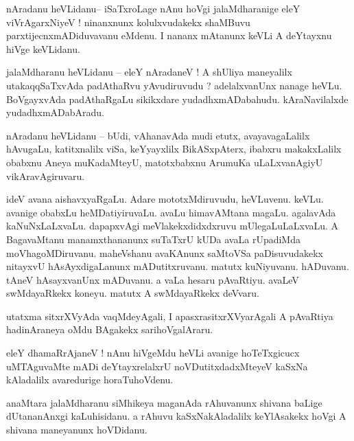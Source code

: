\documentclass{article}
\begin{document}
\begin{mn}%
nAradanu heVLidanu-- iSaTxroLage nAnu hoVgi jalaMdharanige eleY viVrAgarxNiyeV ! ninanxnunx 
kolulxvudakekx shaMBuvu parxtijecnxmADiduvavanu eMdenu. I nananx mAtanunx keVLi A deYtayxnu 
hiVge keVLidanu.
\end{mn}

\begin{mn}%
jalaMdharanu heVLidanu -- eleY nAradaneV ! A shUliya maneyalilx utakaqqSaTxvAda padAthaRvu 
yAvudiruvudu ? adelalxvanUnx nanage heVLu. BoVgayxvAda padAthaRgaLu sikikxdare 
yudadhxmADabahudu. kAraNavilalxde yudadhxmADabAradu.
\end{mn}

\begin{mn}%
nAradanu heVLidanu -- bUdi, vAhanavAda mudi etutx, avayavagaLalilx hAvugaLu, katitxnalilx viSa,
keYyayxlilx BikASxpAterx, ibabxru makakxLalilx obabxnu Aneya muKadaMteyU, matotxbabxnu 
ArumuKa uLaLxvanAgiyU vikAravAgiruvaru.
\end{mn}

\begin{mn}%
ideV avana aishavxyaRgaLu. Adare mototxMdiruvudu, heVLuvenu. keVLu. avanige obabxLu 
heMDatiyiruvaLu. avaLu himavAMtana magaLu. agalavAda kaNuNxLaLxvaLu. dapapxvAgi 
meVlakekxdidxdxruvu mUlegaLuLaLxvaLu. A BagavaMtanu manamxthananunx suTaTxrU kUDa avaLa 
rUpadiMda moVhagoMDiruvanu. maheVshanu avaKAnunx saMtoVSa paDisuvudakekx nitayxvU 
hAsAyxdigaLanunx mADutitxruvanu. matutx kuNiyuvanu. hADuvanu. tAneV hAsayxvanUnx mADuvanu. a
vaLa hesaru pAvaRtiyu. avaLeV swMdayaRkekx koneyu. matutx A swMdayaRkekx deVvaru.
\end{mn}

\begin{mn}%
utatxma sitxrXVyAda vaqMdeyAgali, I apasxrasitxrXVyarAgali A pAvaRtiya hadinAraneya oMdu 
BAgakekx sarihoVgalAraru.
\end{mn}

\begin{mn}%
eleY dhamaRrAjaneV ! nAnu hiVgeMdu heVLi avanige hoTeTxgicucx uMTAguvaMte mADi 
deYtayxrelalxrU noVDutitxdadxMteyeV kaSxNa kAladalilx avaredurige horaTuhoVdenu.
\end{mn}

\begin{mn}%
anaMtara jalaMdharanu siMhikeya maganAda rAhuvanunx shivana baLige dUtananAnxgi 
kaLuhisidanu. a rAhuvu kaSxNakAladalilx keYlAsakekx hoVgi A shivana maneyanunx hoVDidanu.
\end{mn}
\end{document}
